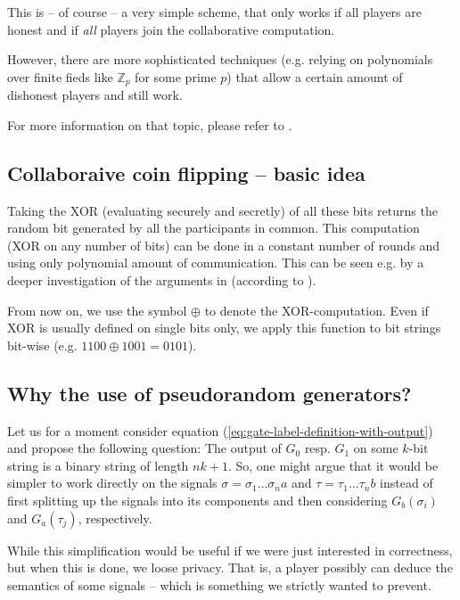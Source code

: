 \message{ !name(seminar.tex)}\documentclass{llncs}
\begin{document}
This is -- of course -- a very simple scheme, that only works if all players are honest and if \emph{all} players join the collaborative computation.

However, there are more sophisticated techniques (e.g. relying on polynomials over finite fieds like $\mathbb Z_p$ for some prime $p$) that allow a certain amount of dishonest players and still work. 

For more information on that topic, please refer to \cite{shamir_secret_sharing}.

\subsection{Collaboraive coin flipping -- basic idea}
\label{sec:appendix-coin-flipping}

Taking the XOR (evaluating securely and secretly) of all these bits returns the random bit generated by all the participants in common. This computation (XOR on any number of bits) can be done in a constant number of rounds and using only polynomial amount of communication. This can be seen e.g. by a deeper investigation of the arguments in \cite{beaver-verifiable-secret-sharing} (according to \cite{Beaver1990}).

From now on, we use the symbol $\oplus$ to denote the XOR-computation. Even if XOR is usually defined on single bits only, we apply this function to bit strings bit-wise (e.g. $1100\oplus1001=0101$).

\subsection{Why the use of pseudorandom generators?}
\label{sec:appendix-why-pseudorandom-generators}

Let us for a moment consider equation (\ref{eq:gate-label-definition-with-output}) and propose the following question: The output of $G_0$ resp. $G_1$ on some $k$-bit string is a binary string of length $nk+1$. So, one might argue that it would be simpler to work directly on the signals $\sigma=\sigma_1\dots\sigma_n a$ and $\tau=\tau_1\dots\tau_n b$ instead of first splitting up the signals into its components and then considering $G_b(\sigma_i)$ and $G_a(\tau_j)$, respectively.

While this simplification would be useful if we were just interested in correctness, but when this is done, we loose privacy. That is, a player possibly can deduce the semantics of some signals -- which is something we strictly wanted to prevent.
\end{document}
